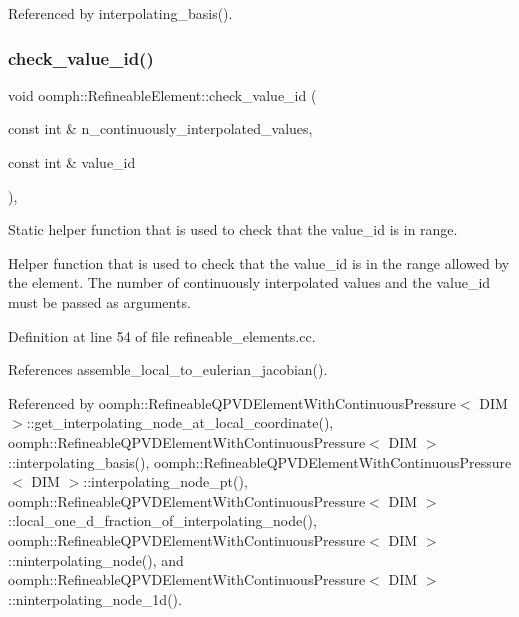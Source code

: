 Referenced by interpolating\+\_\+basis().

\mbox{\label{classoomph_1_1RefineableElement_a6d48d9a4d43fbd7f089b17dc8cf4fc1d}} 
\subsubsection{\texorpdfstring{check\+\_\+value\+\_\+id()}{check\_value\_id()}}
{\footnotesize\ttfamily void oomph\+::\+Refineable\+Element\+::check\+\_\+value\+\_\+id (\begin{DoxyParamCaption}\item[{const int \&}]{n\+\_\+continuously\+\_\+interpolated\+\_\+values,  }\item[{const int \&}]{value\+\_\+id }\end{DoxyParamCaption})\hspace{0.3cm}{\ttfamily [static]}, {\ttfamily [protected]}}



Static helper function that is used to check that the value\+\_\+id is in range. 

Helper function that is used to check that the value\+\_\+id is in the range allowed by the element. The number of continuously interpolated values and the value\+\_\+id must be passed as arguments. 

Definition at line 54 of file refineable\+\_\+elements.\+cc.



References assemble\+\_\+local\+\_\+to\+\_\+eulerian\+\_\+jacobian().



Referenced by oomph\+::\+Refineable\+Q\+P\+V\+D\+Element\+With\+Continuous\+Pressure$<$ D\+I\+M $>$\+::get\+\_\+interpolating\+\_\+node\+\_\+at\+\_\+local\+\_\+coordinate(), oomph\+::\+Refineable\+Q\+P\+V\+D\+Element\+With\+Continuous\+Pressure$<$ D\+I\+M $>$\+::interpolating\+\_\+basis(), oomph\+::\+Refineable\+Q\+P\+V\+D\+Element\+With\+Continuous\+Pressure$<$ D\+I\+M $>$\+::interpolating\+\_\+node\+\_\+pt(), oomph\+::\+Refineable\+Q\+P\+V\+D\+Element\+With\+Continuous\+Pressure$<$ D\+I\+M $>$\+::local\+\_\+one\+\_\+d\+\_\+fraction\+\_\+of\+\_\+interpolating\+\_\+node(), oomph\+::\+Refineable\+Q\+P\+V\+D\+Element\+With\+Continuous\+Pressure$<$ D\+I\+M $>$\+::ninterpolating\+\_\+node(), and oomph\+::\+Refineable\+Q\+P\+V\+D\+Element\+With\+Continuous\+Pressure$<$ D\+I\+M $>$\+::ninterpolating\+\_\+node\+\_\+1d().

